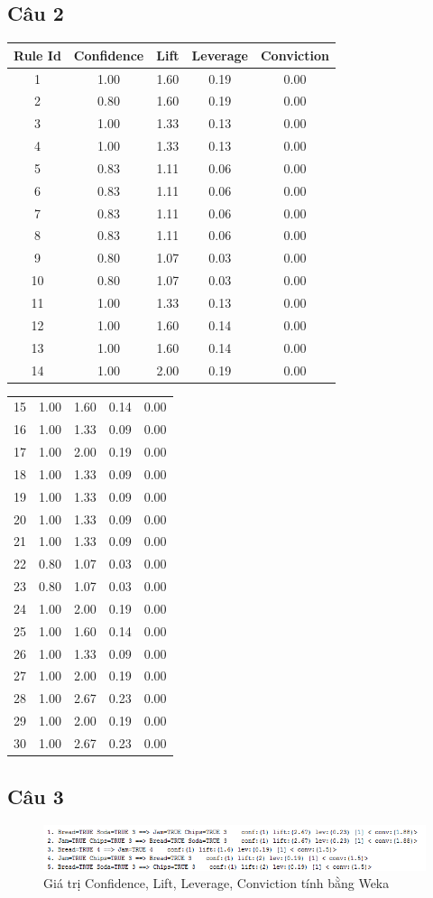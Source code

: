 \documentclass{article}
\begin{document}
\subsection{Câu 2}

\begin{longtable}{c | c c c c}
	Rule Id & Confidence & Lift & Leverage & Conviction\\ \hline 
	1 & 1.00 & 1.60 & 0.19 & 0.00 \\ 
	2 & 0.80 & 1.60 & 0.19 & 0.00 \\ 
	3 & 1.00 & 1.33 & 0.13 & 0.00 \\ 
	4 & 1.00 & 1.33 & 0.13 & 0.00 \\ 
	5 & 0.83 & 1.11 & 0.06 & 0.00 \\ 
	6 & 0.83 & 1.11 & 0.06 & 0.00 \\ 
	7 & 0.83 & 1.11 & 0.06 & 0.00 \\ 
	8 & 0.83 & 1.11 & 0.06 & 0.00 \\ 
	9 & 0.80 & 1.07 & 0.03 & 0.00 \\ 
	10 & 0.80 & 1.07 & 0.03 & 0.00 \\ 
	11 & 1.00 & 1.33 & 0.13 & 0.00 \\ 
	12 & 1.00 & 1.60 & 0.14 & 0.00 \\ 
	13 & 1.00 & 1.60 & 0.14 & 0.00 \\ 
	14 & 1.00 & 2.00 & 0.19 & 0.00 \\ 
\end{longtable}%
\begin{longtable}{c | c c c c}
	15 & 1.00 & 1.60 & 0.14 & 0.00 \\ 
	16 & 1.00 & 1.33 & 0.09 & 0.00 \\ 
	17 & 1.00 & 2.00 & 0.19 & 0.00 \\ 
	18 & 1.00 & 1.33 & 0.09 & 0.00 \\ 
	19 & 1.00 & 1.33 & 0.09 & 0.00 \\ 
	20 & 1.00 & 1.33 & 0.09 & 0.00 \\ 
	21 & 1.00 & 1.33 & 0.09 & 0.00 \\ 
	22 & 0.80 & 1.07 & 0.03 & 0.00 \\ 
	23 & 0.80 & 1.07 & 0.03 & 0.00 \\ 
	24 & 1.00 & 2.00 & 0.19 & 0.00 \\ 
	25 & 1.00 & 1.60 & 0.14 & 0.00 \\ 
	26 & 1.00 & 1.33 & 0.09 & 0.00 \\ 
	27 & 1.00 & 2.00 & 0.19 & 0.00 \\ 
	28 & 1.00 & 2.67 & 0.23 & 0.00 \\ 
	29 & 1.00 & 2.00 & 0.19 & 0.00 \\ 
	30 & 1.00 & 2.67 & 0.23 & 0.00 \\ 
\end{longtable}

\subsection{Câu 3}
\begin{figure}[H]
	\centering
	\caption{Giá trị Confidence, Lift, Leverage, Conviction tính bằng Weka}
	\includegraphics[scale = 0.8]{Measure}
\end{figure}
\end{document}
